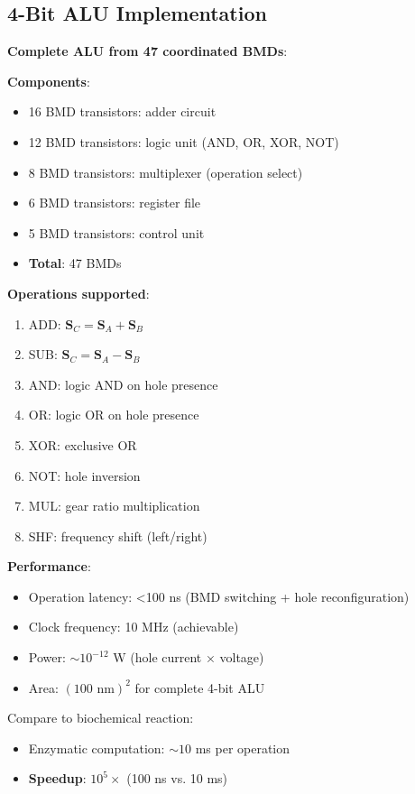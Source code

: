 \documentclass[11pt,a4paper]{article}
\begin{document}
\subsection{4-Bit ALU Implementation}

\textbf{Complete ALU from 47 coordinated BMDs}:

\textbf{Components}:
\begin{itemize}
\item 16 BMD transistors: adder circuit
\item 12 BMD transistors: logic unit (AND, OR, XOR, NOT)
\item 8 BMD transistors: multiplexer (operation select)
\item 6 BMD transistors: register file
\item 5 BMD transistors: control unit
\item \textbf{Total}: 47 BMDs
\end{itemize}

\textbf{Operations supported}:
\begin{enumerate}
\item ADD: $\mathbf{S}_C = \mathbf{S}_A + \mathbf{S}_B$
\item SUB: $\mathbf{S}_C = \mathbf{S}_A - \mathbf{S}_B$
\item AND: logic AND on hole presence
\item OR: logic OR on hole presence
\item XOR: exclusive OR
\item NOT: hole inversion
\item MUL: gear ratio multiplication
\item SHF: frequency shift (left/right)
\end{enumerate}

\textbf{Performance}:
\begin{itemize}
\item Operation latency: <100 ns (BMD switching + hole reconfiguration)
\item Clock frequency: 10 MHz (achievable)
\item Power: $\sim 10^{-12}$ W (hole current × voltage)
\item Area: $(100 \text{ nm})^2$ for complete 4-bit ALU
\end{itemize}

Compare to biochemical reaction:
\begin{itemize}
\item Enzymatic computation: $\sim 10$ ms per operation
\item \textbf{Speedup}: $10^5\times$ (100 ns vs. 10 ms)
\end{itemize}
\end{document}
